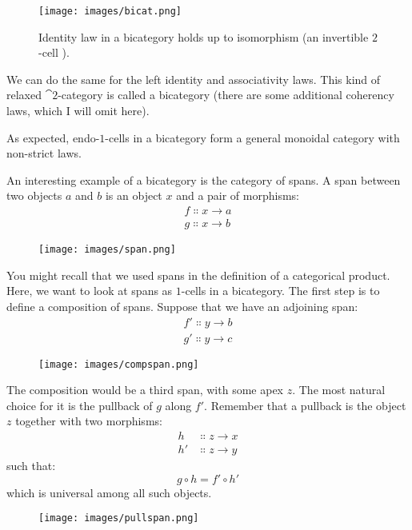 \begin{figure}[H]
\centering
\texttt{[image: images/bicat.png]}
\caption{Identity law in a bicategory holds up to isomorphism (an invertible
$2$-cell \rho).}
\end{figure}

\noindent
We can do the same for the left identity and associativity laws. This
kind of relaxed $\cat{2}$-category is called a bicategory (there are some
additional coherency laws, which I will omit here).

As expected, endo-$1$-cells in a bicategory form a general monoidal
category with non-strict laws.

An interesting example of a bicategory is the category of spans. A span
between two objects $a$ and $b$ is an object $x$
and a pair of morphisms:
\begin{gather*}
f \Colon x \to a \\
g \Colon x \to b
\end{gather*}

\begin{figure}[H]
\centering
\texttt{[image: images/span.png]}
\end{figure}

\noindent
You might recall that we used spans in the definition of a categorical
product. Here, we want to look at spans as $1$-cells in a bicategory. The
first step is to define a composition of spans. Suppose that we have an
adjoining span:
\begin{gather*}
f' \Colon y \to b \\
g' \Colon y \to c
\end{gather*}

\begin{figure}[H]
\centering
\texttt{[image: images/compspan.png]}
\end{figure}

\noindent
The composition would be a third span, with some apex $z$. The
most natural choice for it is the pullback of $g$ along
$f'$. Remember that a pullback is the object $z$
together with two morphisms:
\begin{align*}
h &\Colon z \to x \\
h' &\Colon z \to y
\end{align*}
such that:
\[g \circ h = f' \circ h'\]
which is universal among all such objects.

\begin{figure}[H]
\centering
\texttt{[image: images/pullspan.png]}\\
\end{figure}

